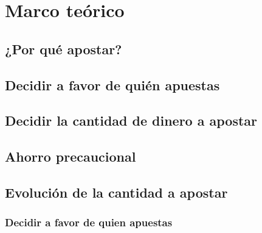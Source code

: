 \chapter{Marco teórico}
\section{¿Por qué apostar?}
\section{Decidir a favor de quién apuestas}
\section{Decidir la cantidad de dinero a apostar}
\section{Ahorro precaucional}
\section{Evolución de la cantidad a apostar}

\subsection{Decidir a favor de quien apuestas}

